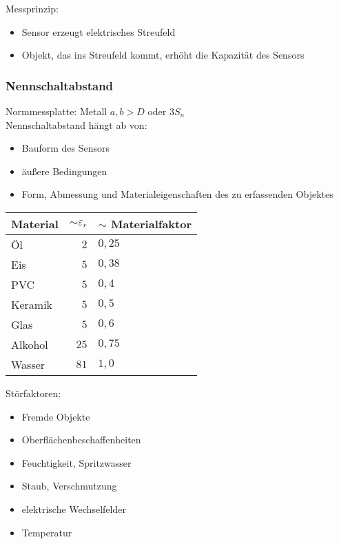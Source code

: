 Messprinzip:
\begin{itemize}
\item Sensor erzeugt elektrisches Streufeld
\item Objekt, das ins Streufeld kommt, erhöht die Kapazität des Sensors
\end{itemize}

\subsubsection{Nennschaltabstand}
Normmessplatte: Metall $a,b>D$ oder $3 S_n$\\
Nennschaltabstand hängt ab von:
\begin{itemize}
\item Bauform des Sensors
\item äußere Bedingungen
\item Form, Abmessung und Materialeigenschaften des zu erfassenden Objektes
\end{itemize}
\begin{tabular}{l | r l}
Material & $\sim \varepsilon_r$ & $\sim$ Materialfaktor\\\hline 
Öl & $2$ & $0,25$\\
Eis & $5$ & $0,38$\\
PVC & $5$ & $0,4$\\
Keramik & $5$ & $0,5$\\
Glas & $5$ & $0,6$\\
Alkohol & $25$ & $0,75$\\
Wasser & $81$ & $1,0$
\end{tabular}

Störfaktoren:
\begin{itemize}
\item Fremde Objekte
\item Oberflächenbeschaffenheiten
\item Feuchtigkeit, Spritzwasser
\item Staub, Verschmutzung
\item elektrische Wechselfelder
\item Temperatur
\end{itemize}

